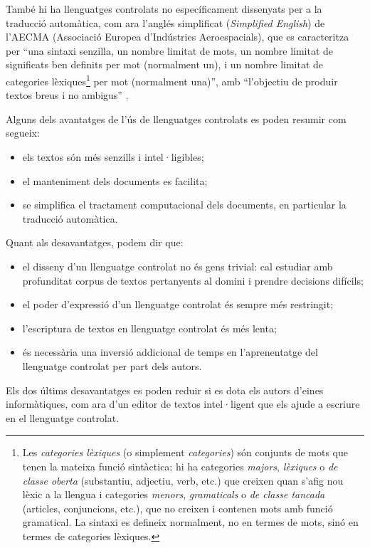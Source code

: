 També hi ha llenguatges controlats no específicament dissenyats per a
la traducció automàtica, com ara l'anglés simplificat ({\em Simplified
  English}) de l'AECMA (Associació Europea d'Indústries
Aeroespacials), que es caracteritza per ``una sintaxi senzilla, un
nombre limitat de mots, un nombre limitat de significats ben definits
per mot (normalment un), i un nombre limitat de categories
lèxiques\footnote{Les \emph{categories lèxiques} (o simplement
  \emph{categories}) són conjunts de mots que tenen la mateixa funció
  sintàctica; hi ha categories \emph{majors}, \emph{lèxiques} o
  \emph{de classe oberta} (substantiu, adjectiu, verb, etc.) que
  creixen quan s'afig nou lèxic a la llengua i categories
  \emph{menors}, \emph{gramaticals} o \emph{de classe tancada}
  (articles, conjuncions, etc.), que no creixen i contenen mots amb
  funció gramatical. La sintaxi es defineix normalment, no en termes
  de mots, sinó en termes de categories lèxiques.}\label{pg:catgra}
per mot (normalment una)'', amb ``l'objectiu de produir textos breus i
no ambigus'' \citep{AECMA07u}.

Alguns dels avantatges de l'ús de llenguatges controlats
\citep{schwitten07u} es poden resumir com segueix:
\begin{itemize}
\item els textos són més senzills i intel·ligibles;
\item el manteniment dels documents es facilita;
\item se simplifica el tractament computacional dels documents, en
  particular la traducció automàtica.
\end{itemize}
Quant als desavantatges, podem dir que:
\begin{itemize}
\item el disseny d'un llenguatge controlat no és gens trivial: cal
  estudiar amb profunditat corpus de textos pertanyents al domini i
  prendre decisions difícils;
\item el poder d'expressió d'un llenguatge controlat és sempre més
  restringit;
\item l'escriptura de textos en llenguatge controlat és més lenta;
\item és necessària una inversió addicional de temps en l'aprenentatge
  del llenguatge controlat per part dels autors.
\end{itemize}
Els dos últims desavantatges es poden reduir si es dota els autors
d'eines informàtiques, com ara d'un editor de textos intel·ligent que
els ajude a escriure en el llenguatge controlat.

